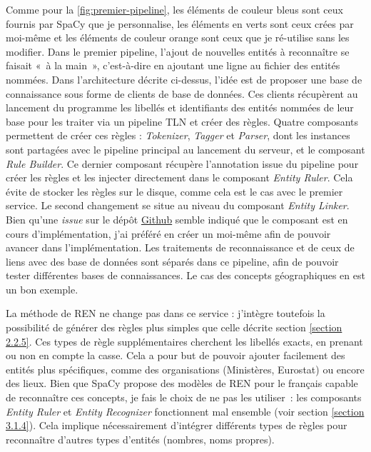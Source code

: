 Comme pour la \autoref{fig:premier-pipeline}, les éléments de couleur bleus sont ceux fournis par SpaCy que je personnalise, les éléments en verts sont ceux crées par moi-même et les éléments de couleur orange sont ceux que je ré-utilise sans les modifier. Dans le premier pipeline, l'ajout de nouvelles entités à reconnaître se faisait «~à la main~», c'est-à-dire en ajoutant une ligne au fichier des entités nommées. Dans l'architecture décrite ci-dessus, l'idée est de proposer une base de connaissance sous forme de clients de base de données. Ces clients récupèrent au lancement du programme les libellés et identifiants des entités nommées de leur base pour les traiter via un pipeline TLN et créer des règles. Quatre composants permettent de créer ces règles : \textit{Tokenizer}, \textit{Tagger} et \textit{Parser}, dont les instances sont partagées avec le pipeline principal au lancement du serveur, et le composant \textit{Rule Builder}. Ce dernier composant récupère l'annotation issue du pipeline pour créer les règles et les injecter directement dans le composant \textit{Entity Ruler}. Cela évite de stocker les règles sur le disque, comme cela est le cas avec le premier service.
Le second changement se situe au niveau du composant \textit{Entity Linker}. Bien qu'une \textit{issue} sur le dépôt \href{https://github.com/explosion/spaCy/issues}{Github} semble indiqué que le composant est en cours d'implémentation, j'ai préféré en créer un moi-même afin de pouvoir avancer dans l'implémentation. Les traitements de reconnaissance et de ceux de liens avec des base de données sont séparés dans ce pipeline, afin de pouvoir tester différentes bases de connaissances. Le cas des concepts géographiques en est un bon exemple.
\newline

La méthode de REN ne change pas dans ce service : j'intègre toutefois la possibilité de générer des règles plus simples que celle décrite section \ref{section 2.2.5}. Ces types de règle supplémentaires cherchent les libellés exacts, en prenant ou non en compte la casse. Cela a pour but de pouvoir ajouter facilement des entités plus spécifiques, comme des organisations (Ministères, Eurostat) ou encore des lieux. Bien que SpaCy propose des modèles de REN pour le français capable de reconnaître ces concepts, je fais le choix de ne pas les utiliser~: les composants \textit{Entity Ruler} et \textit{Entity Recognizer} fonctionnent mal ensemble (voir section \ref{section 3.1.4}). Cela implique nécessairement d'intégrer différents types de règles pour reconnaître d'autres types d'entités (nombres, noms propres). 
\newline

